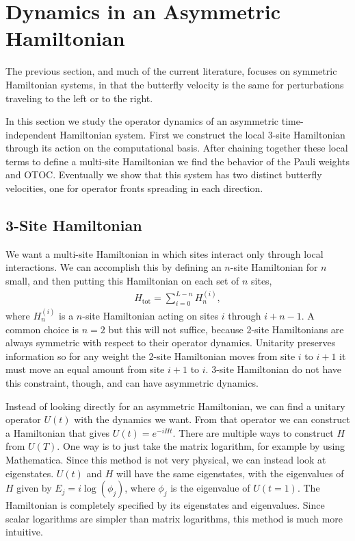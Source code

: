 \section{Dynamics in an Asymmetric Hamiltonian} \label{sec:asymham}

The previous section, and much of the current literature, focuses on symmetric Hamiltonian systems, in that the butterfly velocity is the same for perturbations traveling to the left or to the right.

In this section we study the operator dynamics of an asymmetric time-independent Hamiltonian system. First we construct the local 3-site Hamiltonian through its action on the computational basis. 
After chaining together these local terms to define a multi-site Hamiltonian we find the behavior of the Pauli weights and OTOC. Eventually we show that this system has two distinct butterfly velocities, one for operator fronts spreading in each direction.

\subsection{3-Site Hamiltonian}  \label{sub:hamiltonian}

We want a multi-site Hamiltonian in which sites interact only through local interactions. We can accomplish this by defining an $n$-site Hamiltonian for $n$ small, and then putting this Hamiltonian on each set of $n$ sites,
\begin{align}
H_{\text{tot}} = \sum_{i=0}^{L-n}H_n^{(i)},
 \label{eqn:chain}
\end{align}
where $H_n^{(i)}$ is a $n$-site Hamiltonian acting on sites $i$ through $i+n-1$.
A common choice is $n=2$ but this will not suffice, because 2-site Hamiltonians are always symmetric with respect to their operator dynamics. Unitarity preserves information so for any weight the 2-site Hamiltonian moves from site $i$ to $i+1$ it must move an equal amount from site $i+1$ to $i$. 3-site Hamiltonian do not have this constraint, though, and can have asymmetric dynamics.

Instead of looking directly for an asymmetric Hamiltonian, we can find a unitary operator $U(t)$ with the dynamics we want. From that operator we can construct a Hamiltonian that gives $U(t)=e^{-iHt}$. There are multiple ways to construct $H$ from $U(T)$. One way is to just take the matrix logarithm, for example by using Mathematica. Since this method is not very physical, we can instead look at eigenstates. $U(t)$ and $H$ will have the same eigenstates, with the eigenvalues of $H$ given by $E_j = i\log(\phi_j)$, where $\phi_j$ is the eigenvalue of $U(t=1)$. The Hamiltonian is completely specified by its eigenstates and eigenvalues. Since scalar logarithms are simpler than matrix logarithms, this method is much more intuitive.

